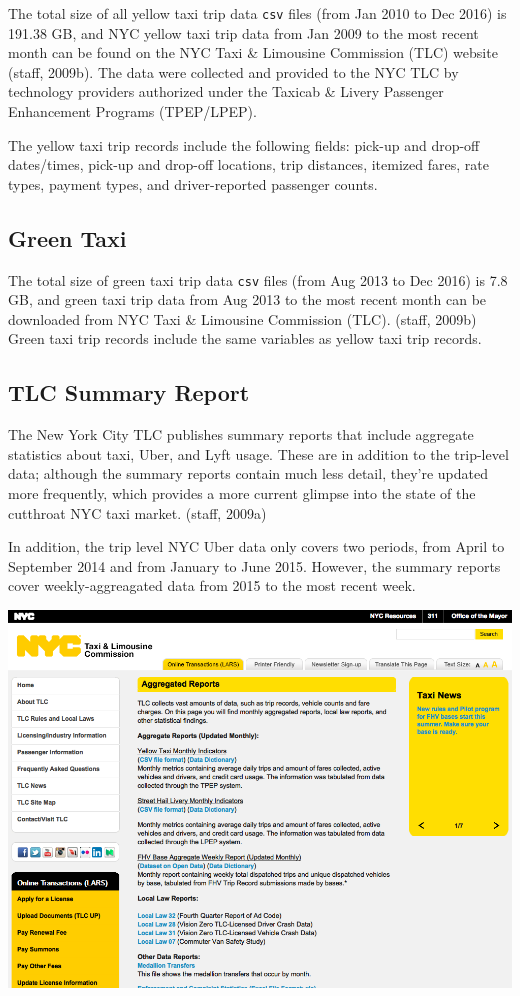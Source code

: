 \documentclass[12pt,twoside]{reedthesis}
\theoremstyle{definition}
\theoremstyle{definition}
\theoremstyle{definition}
\theoremstyle{remark}
\begin{document}
The total size of all yellow taxi trip data \texttt{csv} files (from Jan
2010 to Dec 2016) is 191.38 GB, and NYC yellow taxi trip data from Jan
2009 to the most recent month can be found on the NYC Taxi \& Limousine
Commission (TLC) website (staff, 2009b). The data were collected and
provided to the NYC TLC by technology providers authorized under the
Taxicab \& Livery Passenger Enhancement Programs (TPEP/LPEP).

The yellow taxi trip records include the following fields: pick-up and
drop-off dates/times, pick-up and drop-off locations, trip distances,
itemized fares, rate types, payment types, and driver-reported passenger
counts.

\subsection{Green Taxi}\label{green-taxi-1}

The total size of green taxi trip data \texttt{csv} files (from Aug 2013
to Dec 2016) is 7.8 GB, and green taxi trip data from Aug 2013 to the
most recent month can be downloaded from NYC Taxi \& Limousine
Commission (TLC). (staff, 2009b) Green taxi trip records include the
same variables as yellow taxi trip records.

\subsection{TLC Summary Report}\label{tlc-summary-report}

The New York City TLC publishes summary reports that include aggregate
statistics about taxi, Uber, and Lyft usage. These are in addition to
the trip-level data; although the summary reports contain much less
detail, they're updated more frequently, which provides a more current
glimpse into the state of the cutthroat NYC taxi market. (staff, 2009a)

In addition, the trip level NYC Uber data only covers two periods, from
April to September 2014 and from January to June 2015. However, the
summary reports cover weekly-aggreagated data from 2015 to the most
recent week.
\begin{center}\includegraphics[width=5.84in]{figure/a-report} \end{center}
\end{document}

